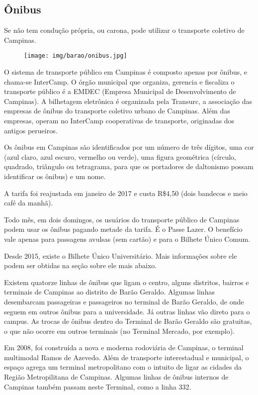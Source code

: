 \subsection{Ônibus}

Se não tem condução própria, ou carona, pode utilizar o transporte coletivo de
Campinas.

\begin{figure}[h!]  \centering
    \texttt{[image: img/barao/onibus.jpg]}
\end{figure}

O sistema de transporte público em Campinas é composto apenas por ônibus, e
chama-se InterCamp. O órgão municipal que organiza, gerencia e fiscaliza o
transporte público é a EMDEC (Empresa Municipal de Desenvolvimento de
Campinas). A bilhetagem eletrônica é organizada pela Transurc, a associação das
empresas de ônibus do transporte coletivo urbano de Campinas. Além das
empresas, operam no InterCamp cooperativas de transporte, originadas dos
antigos perueiros.

Os ônibus em Campinas são identificados por um número de três dígitos, uma cor
(azul claro, azul escuro, vermelho ou verde), uma figura geométrica (círculo,
quadrado, triângulo ou tetragrama, para que os portadores de daltonismo possam
identificar os ônibus) e um nome.

A tarifa foi reajustada em janeiro de 2017 e custa R\$4,50 (dois bandecos e
meio café da manhã).

Todo mês, em dois domingos, os usuários do transporte público de Campinas podem
usar os ônibus pagando metade da tarifa. É o Passe Lazer. O benefício vale
apenas para passagens avulsas (sem cartão) e para o Bilhete Único Comum.

Desde 2015, existe o Bilhete Único Universitário. Mais informações sobre ele
podem ser obtidas na seção sobre ele mais abaixo.

Existem quatorze linhas de ônibus que ligam o centro, alguns distritos, bairros
e terminais de Campinas ao distrito de Barão Geraldo. Algumas linhas
desembarcam passageiras e passageiros no terminal de Barão Geraldo, de onde
seguem em outros ônibus para a universidade. Já outras linhas vão direto para o
campus. As trocas de ônibus dentro do Terminal de Barão Geraldo são gratuitas,
o que não ocorre em outros terminais (no Terminal Mercado, por exemplo).

Em 2008, foi construída a nova e moderna rodoviária de Campinas, o terminal
multimodal Ramos de Azevedo. Além de transporte interestadual e municipal, o
espaço agrega um terminal metropolitano com o intuito de ligar as cidades da
Região Metropilitana de Campinas. Algumas linhas de ônibus internos de Campinas
também passam neste Terminal, como a linha 332.

